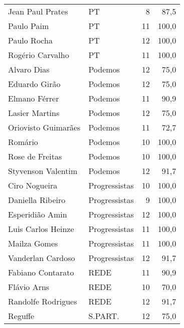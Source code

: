\begin{longtable}{llrr}
        Jean Paul Prates &             PT &                   8 &         87,5 \\
              Paulo Paim &             PT &                  11 &        100,0 \\
             Paulo Rocha &             PT &                  12 &        100,0 \\
        Rogério Carvalho &             PT &                  11 &        100,0 \\
             Alvaro Dias &        Podemos &                  12 &         75,0 \\
           Eduardo Girão &        Podemos &                  12 &         75,0 \\
           Elmano Férrer &        Podemos &                  11 &         90,9 \\
          Lasier Martins &        Podemos &                  12 &         75,0 \\
     Oriovisto Guimarães &        Podemos &                  11 &         72,7 \\
                 Romário &        Podemos &                  10 &        100,0 \\
         Rose de Freitas &        Podemos &                  10 &        100,0 \\
      Styvenson Valentim &        Podemos &                  12 &         91,7 \\
           Ciro Nogueira &  Progressistas &                  10 &        100,0 \\
        Daniella Ribeiro &  Progressistas &                   9 &        100,0 \\
         Esperidião Amin &  Progressistas &                  12 &        100,0 \\
      Luis Carlos Heinze &  Progressistas &                  11 &        100,0 \\
            Mailza Gomes &  Progressistas &                  11 &        100,0 \\
       Vanderlan Cardoso &  Progressistas &                  12 &         91,7 \\
       Fabiano Contarato &           REDE &                  11 &         90,9 \\
             Flávio Arns &           REDE &                  10 &         70,0 \\
      Randolfe Rodrigues &           REDE &                  12 &         91,7 \\
                 Reguffe &        S.PART. &                  12 &         75,0 \\
\end{longtable}
